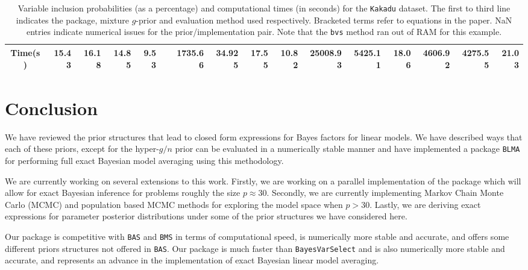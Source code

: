 \documentclass[12pt]{article}
\begin{document}
\begin{sidewaystable}[h!]
{\begin{tabular}{c|r|r|rrrrrr|rrrr|rrr}
Time(s) & 15.43 & 16.18 & 14.85  &  9.53   &       & 1735.66  & 34.925  &   17.55 &  10.82         &  25008.93 & 
5425.11  &   18.06   & 4606.92       &  4275.55  & 21.03  \\ 
	\hline
\end{tabular}
}
	\caption{Variable inclusion probabilities (as a percentage) and computational times (in seconds) for the {\tt Kakadu} dataset.
	The first to third line indicates the package, mixture $g$-prior and evaluation method used respectively. Bracketed terms
	refer to equations in the paper. NaN entries indicate numerical issues for the prior/implementation pair. Note that 
	the {\tt bvs} method ran out of RAM for this example.}
\label{tab:Kakadu}
\end{sidewaystable}

 
\section{Conclusion}
\label{sec:conclusion}

We have reviewed the prior structures that lead to closed form expressions for Bayes factors for
linear models. We have described ways that each of these priors, except for the hyper-$g/n$ 
prior can be evaluated in a numerically stable manner and have implemented a package 
{\tt BLMA} for performing full exact Bayesian model averaging using
this methodology. 

We are currently working on several extensions to this work. Firstly, we are working on a
parallel implementation of the package which will allow for exact Bayesian inference for
problems roughly the size $p\approx 30$. Secondly, we are currently implementing  Markov
Chain Monte Carlo (MCMC) and population based MCMC methods for exploring the model space
when $p>30$. Lastly, we are deriving exact expressions for parameter posterior distributions
under some of the prior structures we have considered here.


Our package is competitive with {\tt BAS} and {\tt BMS} in terms of computational speed,
is numerically more stable and accurate, and offers some different priors structures not
offered in {\tt BAS}. Our package is much faster than {\tt BayesVarSelect} and is also
numerically more stable and accurate, and represents an advance in the implementation of
exact Bayesian linear model averaging.





 
 

 
\end{document}
